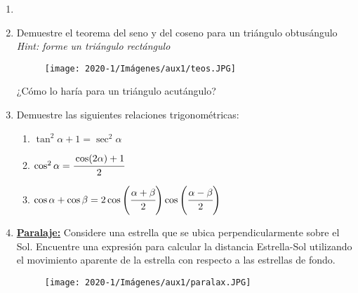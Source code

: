 \documentclass[letterpaper,11pt]{article}
\begin{document}
\vspace{-1cm}
\begin{enumerate}\setlength{\itemsep}{0.4cm}


\item[]

\item Demuestre el teorema del seno y del coseno para un triángulo obtusángulo\\
\textit{Hint: forme un triángulo rectángulo}
\begin{figure}[h!]
    \centering
    \texttt{[image: 2020-1/Imágenes/aux1/teos.JPG]}
\end{figure}

¿Cómo lo haría para un triángulo acutángulo?
    


\item Demuestre las siguientes relaciones trigonométricas: 
    \begin{enumerate}
        \item $\tan^2\alpha+1=\sec^2\alpha$
        
        \item $\cos^2\alpha=\cfrac{\cos(2\alpha)+1}{2}$
        
        \item $\cos \alpha+\cos\beta=2\cos\left(\cfrac{\alpha+\beta}{2}\right)\cos\left(\cfrac{\alpha-\beta}{2}\right)$
    \end{enumerate}
    
\item \href{https://www.geogebra.org/material/iframe/id/C6mhehH7/width/625/height/625/border/888888/sfsb/true/smb/false/stb/false/stbh/false/ai/false/asb/false/sri/false/rc/false/ld/false/sdz/false/ctl/false}{\textbf{Paralaje:}} Considere una estrella que se ubica perpendicularmente sobre el Sol. Encuentre una expresión para calcular la distancia Estrella-Sol utilizando el movimiento aparente de la estrella con respecto a las estrellas de fondo.
    \begin{figure}[h!]
        \centering
        \texttt{[image: 2020-1/Imágenes/aux1/paralax.JPG]}
    \end{figure}

\end{enumerate}
\end{document}
